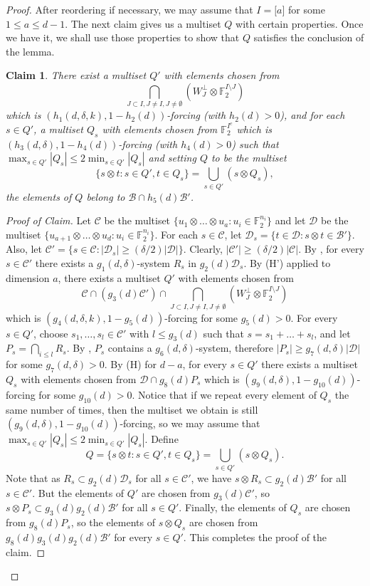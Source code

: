 \documentclass{toc}
\newcommand\F{\mathbb{F}}
\renewcommand\d{\delta}
\newcommand \cB{\mathcal B}
\newcommand \cC{\mathcal C}
\newcommand \cD{\mathcal D}
\newcommand \s{\subset}
\newtheorem*{claim*}{Claim}
\begin{document}
\begin{proof}
  After reordering if necessary, we may assume that $I=\lbrack a\rbrack$ for some $1\leq a \leq d-1$. The next claim gives us a multiset $Q$ with certain properties. Once we have it, we shall use those properties to show that $Q$ satisfies the conclusion of the lemma.
  
  \begin{claim*} There exist a multiset $Q'$ with elements chosen
    from
    \[
      \bigcap_{J\subset I,J\neq I,J\neq
        \emptyset}(W_J^{\perp}\otimes \F_2^{I \setminus J})
    \]
    which is $(h_1(d,\d,k),1-h_2(d))$-forcing (with $h_2(d)>0$), and
    for each $s\in Q'$, a multiset $Q_s$ with elements chosen from
    $\F_2^{I^c}$ which is $(h_3(d,\d),1-h_4(d))$-forcing (with
    $h_4(d)>0$) such that
    $\max_{s\in Q'}|Q_s|\leq 2\min_{s\in Q'}|Q_s|$ and setting $Q$ to
    be the multiset
    \[
      \{s\otimes t: s\in Q',t\in Q_s\}=\bigcup_{s\in Q'}(s\otimes Q_s),
    \]
    the elements of $Q$ belong to $\cB\cap h_5(d)\cB'$.
  \end{claim*}
  
  \begin{proof}[Proof of Claim] Let $\cC$ be the multiset
    $\{u_1\otimes \dots \otimes u_a: u_i\in \F_2^{n_i}\}$ and let
    $\cD$ be the multiset
    $\{u_{a+1}\otimes \dots \otimes u_d: u_i\in \F_2^{n_i}\}$. For
    each $s\in \cC$, let $\cD_s=\{t\in \cD: s\otimes t\in
    \cB'\}$. Also, let
    $\cC'=\{s\in \cC: |\cD_s|\geq ({\d}/{2})|\cD|\}$. Clearly,
    $|\cC'|\geq ({\d}/{2}) |\cC|$. By , for
    every $s\in \cC'$ there exists a $g_1(d,\d)$-system $R_s$ in
    $g_2(d)\cD_s$. By (H') applied to dimension $a$, there exists a
    multiset $Q'$ with elements chosen from
    \[
      \cC\cap (g_3(d)\cC')\cap \bigcap_{J\subset I,J\neq I,J\neq \emptyset}(W_J^{\perp}\otimes \F_2^{I \setminus J})
    \]
    which is $(g_4(d,\d,k),1-g_5(d))$-forcing for some $g_5(d)>0$. For
    every $s\in Q'$, choose $s_1,\dots,s_l\in \cC'$ with
    $l\leq g_3(d)$ such that $s=s_1+\dots+s_l$, and let
    $P_s=\bigcap_{i\leq l}R_s$. By , $P_s$
    contains a $g_6(d,\d)$-system, therefore
    $|P_s|\geq g_7(d,\d)|\cD|$ for some $g_7(d,\d)>0$. By (H) for
    $d-a$, for every $s\in Q'$ there exists a multiset $Q_s$ with
    elements chosen from $\cD\cap g_8(d)P_s$ which is
    $(g_9(d,\d),1-g_{10}(d))$-forcing for some $g_{10}(d)>0$. Notice
    that if we repeat every element of $Q_s$ the same number of times,
    then the multiset we obtain is still
    $(g_9(d,\d),1-g_{10}(d))$-forcing, so we may assume that
    $\max_{s\in Q'}|Q_s|\leq 2\min_{s\in Q'}|Q_s|$. Define
    \[
      Q=\{s\otimes t:s\in Q',t\in Q_s\}=\bigcup_{s\in Q'}(s\otimes
      Q_s).
    \]
    Note that as $R_s\subset g_2(d)\cD_s$ for all $s\in \cC'$, we have
    $s\otimes R_s\subset g_2(d)\cB'$ for all $s\in \cC'$. But the
    elements of $Q'$ are chosen from $g_3(d)\cC'$, so
    $s\otimes P_s\s g_3(d)g_2(d)\cB'$ for all $s\in Q'$. Finally, the
    elements of $Q_s$ are chosen from $g_8(d)P_s$, so the elements of
    $s\otimes Q_s$ are chosen from $g_8(d)g_3(d)g_2(d)\cB'$ for every
    $s\in Q'$. This completes the proof of the claim.
  \end{proof}
  

\end{proof}
\end{document}
